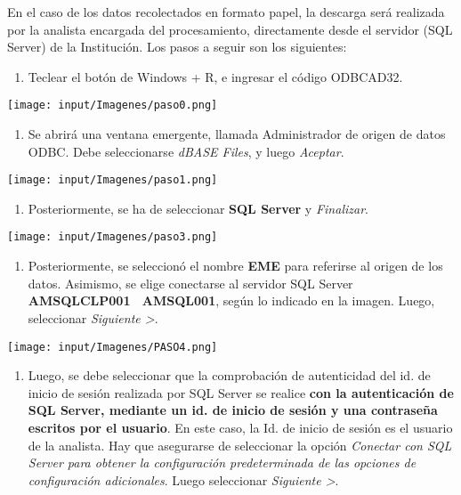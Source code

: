 \documentclass[
]{article}
\providecommand{\tightlist}{%
  \setlength{\itemsep}{0pt}\setlength{\parskip}{0pt}}
\begin{document}
En el caso de los datos recolectados en formato papel, la descarga será realizada por la analista encargada del procesamiento, directamente desde el servidor (SQL Server) de la Institución. Los pasos a seguir son los siguientes:

\begin{enumerate}
\def\labelenumi{\alph{enumi})}
\tightlist
\item
  Teclear el botón de Windows + R, e ingresar el código ODBCAD32.
\end{enumerate}

\texttt{[image: input/Imagenes/paso0.png]}

\begin{enumerate}
\def\labelenumi{\alph{enumi})}
\setcounter{enumi}{1}
\tightlist
\item
  Se abrirá una ventana emergente, llamada Administrador de origen de datos ODBC. Debe seleccionarse \emph{dBASE Files}, y luego \emph{Aceptar}.
\end{enumerate}

\texttt{[image: input/Imagenes/paso1.png]}

\begin{enumerate}
\def\labelenumi{\alph{enumi})}
\setcounter{enumi}{2}
\tightlist
\item
  Posteriormente, se ha de seleccionar \textbf{SQL Server} y \emph{Finalizar}.
\end{enumerate}

\texttt{[image: input/Imagenes/paso3.png]}

\begin{enumerate}
\def\labelenumi{\alph{enumi})}
\setcounter{enumi}{3}
\tightlist
\item
  Posteriormente, se seleccionó el nombre \textbf{EME} para referirse al origen de los datos. Asimismo, se elige conectarse al servidor SQL Server \textbf{AMSQLCLP001 ~AMSQL001}, según lo indicado en la imagen. Luego, seleccionar \emph{Siguiente \textgreater{}}.
\end{enumerate}

\texttt{[image: input/Imagenes/PASO4.png]}

\begin{enumerate}
\def\labelenumi{\alph{enumi})}
\setcounter{enumi}{4}
\tightlist
\item
  Luego, se debe seleccionar que la comprobación de autenticidad del id. de inicio de sesión realizada por SQL Server se realice \textbf{con la autenticación de SQL Server, mediante un id. de inicio de sesión y una contraseña escritos por el usuario}. En este caso, la Id. de inicio de sesión es el usuario de la analista. Hay que asegurarse de seleccionar la opción \emph{Conectar con SQL Server para obtener la configuración predeterminada de las opciones de configuración adicionales}. Luego seleccionar \emph{Siguiente \textgreater{}}.
\end{enumerate}
\end{document}
